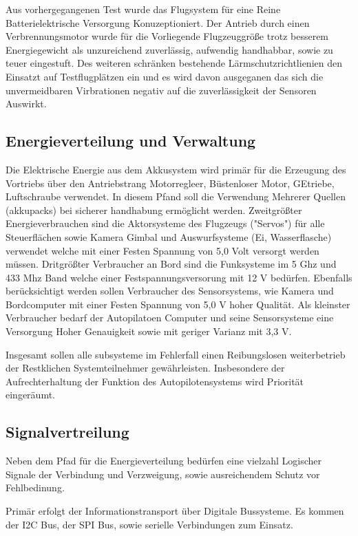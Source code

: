 Aus vorhergegangenen Test wurde das Flugsystem für eine Reine Batterielektrische Versorgung Konuzeptioniert.
Der Antrieb durch einen Verbrennungsmotor wurde für die Vorliegende Flugzeuggröße trotz besserem Energiegewicht als unzureichend zuverlässig, aufwendig handhabbar, sowie zu teuer eingestuft.
Des weiteren schränken bestehende Lärmschutzrichtlienien den Einsatzt auf Testflugplätzen ein und es wird davon ausgeganen das sich die unvermeidbaren Virbrationen negativ auf die zuverlässigkeit der Sensoren Auswirkt.

\subsection{Energieverteilung und Verwaltung}

Die Elektrische Energie aus dem Akkusystem wird primär für die Erzeugung des Vortriebs über den Antriebstrang Motorregleer, Büstenloser Motor, GEtriebe, Luftschraube verwendet.
In diesem Pfand soll die Verwendung Mehrerer Quellen (akkupacks) bei sicherer handhabung ermöglicht werden.
Zweitgrößter Energieverbrauchen sind die Aktorsysteme des Flugzeugs ("Servos") für alle Steuerflächen sowie Kamera Gimbal und Auswurfsysteme (Ei, Wasserflasche) verwendet welche mit einer Festen Spannung von 5,0 Volt versorgt werden müssen.
Dritgrößter Verbraucher an Bord sind die Funksysteme im 5 Ghz und 433 Mhz Band welche einer Festspannungsversorung mit 12 V  bedürfen.
Ebenfalls berücksichtigt werden sollen Verbraucher des Sensorsystems, wie Kamera und Bordcomputer mit einer Festen Spannung von 5,0 V hoher Qualität.
Als kleinster Verbraucher bedarf der Autopilatoen Computer und seine Sensorsysteme eine Versorgung Hoher Genauigkeit sowie mit geriger Varianz mit 3,3 V.

Insgesamt sollen alle subsysteme im Fehlerfall einen Reibungslosen weiterbetrieb der Restklichen Systemteilnehmer gewährleisten. Insbesondere der Aufrechterhaltung der Funktion des Autopilotensystems wird Priorität eingeräumt.


\subsection{Signalvertreilung}

Neben dem Pfad für die Energieverteilung bedürfen eine vielzahl Logischer Signale der Verbindung und Verzweigung, sowie ausreichendem Schutz vor Fehlbedinung.

Primär erfolgt der Informationstransport über Digitale Bussysteme. Es kommen der I2C Bus, der SPI Bus, sowie serielle Verbindungen zum Einsatz.

